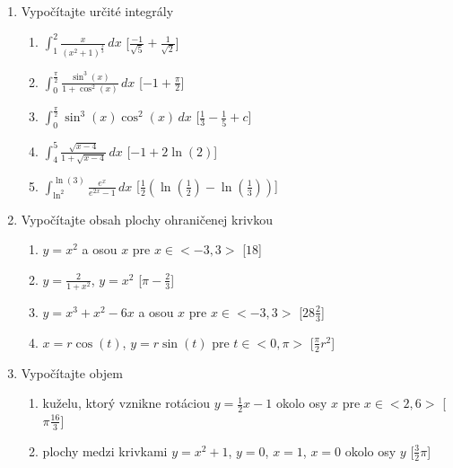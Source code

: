 \begin{enumerate}
\item Vypočítajte určité integrály
\begin{enumerate}
\item{$ \int_1^2 \frac{x}{(x^2+1)^{\frac{3}{3}}} \,dx$} \hspace{\fill} [$\frac{-1}{\sqrt{5}}+\frac{1}{\sqrt{2}}$]
\item{$ \int_0^{\frac{\pi}{2}} \frac{\sin^3(x)}{1+\cos^2(x)} \,dx$} \hspace{\fill} [$-1+\frac{\pi}{2}$]
\item{$ \int_0^{\frac{\pi}{2}} \sin^3(x)\cos^2(x) \,dx$} \hspace{\fill} [$\frac{1}{3}-\frac{1}{5} +c$]
\item{$ \int_4^5 \frac{\sqrt{x-4}}{1+\sqrt{x-4}} \,dx$} \hspace{\fill} [$-1+2\ln(2)$]
\item{$ \int_{\ln^2}^{\ln(3)} \frac{e^x}{e^{2x}-1} \,dx$} \hspace{\fill} [$\frac{1}{2}(\ln(\frac{1}{2})-\ln(\frac{1}{3}))$]
\end{enumerate}


\item Vypočítajte obsah plochy ohraničenej krivkou
\begin{enumerate}
\item{$ y=x^2$ a osou $x$ pre $x \in <-3,3>$} \hspace{\fill} [$18$]
\item{$ y=\frac{2}{1+x^2}$, $y=x^2$} \hspace{\fill} [$\pi-\frac{2}{3}$]
\item{$ y=x^3+x^2-6x$ a osou $x$ pre $x \in <-3,3>$} \hspace{\fill} [$28\frac{2}{3}$]
\item{$x=r\cos(t)$, $y=r\sin(t)$ pre $t \in <0,\pi>$} \hspace{\fill} [$\frac{\pi}{2}r^2$]
\end{enumerate}


\item Vypočítajte objem
\begin{enumerate}
\item{kuželu, ktorý vznikne rotáciou $y=\frac{1}{2}x-1$ okolo osy $x$ pre $x \in <2,6>$} \hspace{\fill} [$\pi\frac{16}{3}$]
\item{plochy medzi krivkami $ y=x^2+1$, $y=0$, $x=1$, $x=0$ okolo osy $y$} \hspace{\fill} [$\frac{3}{2}\pi$]
\end{enumerate}



\end{enumerate}
